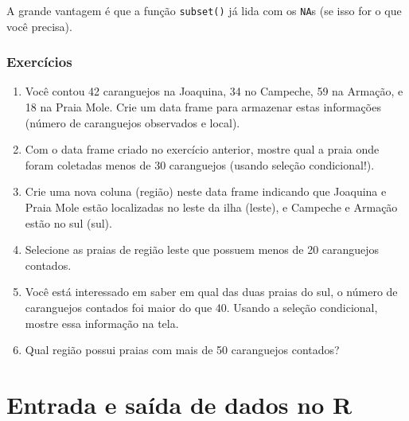 \documentclass[10pt,a4paper]{book}
\newenvironment{Shaded}{\begin{snugshade}}{\end{snugshade}}
\newcommand{\KeywordTok}[1]{\textcolor[rgb]{0.13,0.29,0.53}{\textbf{#1}}}
\newcommand{\DataTypeTok}[1]{\textcolor[rgb]{0.13,0.29,0.53}{#1}}
\newcommand{\DecValTok}[1]{\textcolor[rgb]{0.00,0.00,0.81}{#1}}
\newcommand{\StringTok}[1]{\textcolor[rgb]{0.31,0.60,0.02}{#1}}
\newcommand{\OtherTok}[1]{\textcolor[rgb]{0.56,0.35,0.01}{#1}}
\newcommand{\OperatorTok}[1]{\textcolor[rgb]{0.81,0.36,0.00}{\textbf{#1}}}
\newcommand{\NormalTok}[1]{#1}
\providecommand{\tightlist}{%
  \setlength{\itemsep}{0pt}\setlength{\parskip}{0pt}}
\begin{document}
\begin{Shaded}
\end{Shaded}

A grande vantagem é que a função \texttt{subset()} já lida com os
\texttt{NA}s (se isso for o que você precisa).

\subsection*{Exercícios}\label{exercicios-8}


\begin{enumerate}
\def\labelenumi{\arabic{enumi}.}
\tightlist
\item
  Você contou 42 caranguejos na Joaquina, 34 no Campeche, 59 na Armação,
  e 18 na Praia Mole. Crie um data frame para armazenar estas
  informações (número de caranguejos observados e local).
\item
  Com o data frame criado no exercício anterior, mostre qual a praia
  onde foram coletadas menos de 30 caranguejos (usando seleção
  condicional!).
\item
  Crie uma nova coluna (região) neste data frame indicando que Joaquina
  e Praia Mole estão localizadas no leste da ilha (leste), e Campeche e
  Armação estão no sul (sul).
\item
  Selecione as praias de região leste que possuem menos de 20
  caranguejos contados.
\item
  Você está interessado em saber em qual das duas praias do sul, o
  número de caranguejos contados foi maior do que 40. Usando a seleção
  condicional, mostre essa informação na tela.
\item
  Qual região possui praias com mais de 50 caranguejos contados?
\end{enumerate}

\chapter{Entrada e saída de dados no
R}\label{entrada-e-saida-de-dados-no-r}
\end{document}
